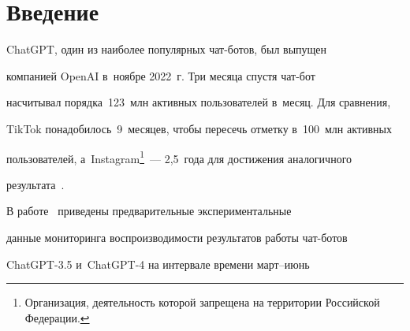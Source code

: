    

















 \thispagestyle{headings}


 


 \vspace*{-28pt}








\section{Введение}





\vspace*{-2pt}





  ChatGPT, один из наиболее популярных чат-бо\-тов, был выпущен 


компанией \mbox{OpenAI} в~ноябре 2022~г. Три месяца спустя чат-бот 


насчитывал порядка~123~млн активных пользователей в~месяц. Для сравнения, 


\mbox{TikTok} понадобилось~9~ме\-ся\-цев, чтобы пересечь отметку в~100~млн активных 


пользователей, а~Instagram\footnote[4]{Организация, деятельность которой запрещена на территории Российской Федерации.}~--- 2,5~года для до\-сти\-же\-ния аналогичного 


результата~\cite{1-eg}. 


  


  В работе~\cite{2-eg} приведены предварительные экспериментальные 


данные мониторинга вос\-про\-из\-во\-ди\-мости результатов работы чат-бо\-тов 


\mbox{ChatGPT-3.5} и~\mbox{ChatGPT-4} на интервале времени март--июнь 


